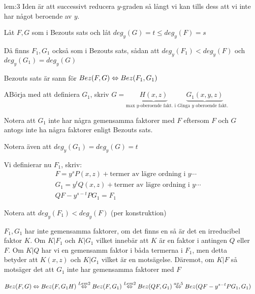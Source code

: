 \par\bigskip
\begin{lem}[3]{lem:3}
  Iden är att successivt reducera $y$-graden så långt vi kan tills dess att vi inte har något beroende av $y$.
  \par\bigskip
  \noindent Låt $F,G$ som i Bezouts sats och låt $deg_y(G) = t\leq deg_y(F) = s$ 
  \par\bigskip
  \noindent Då finns $F_1,G_1$ också som i Bezouts sats, sådan att $deg_y(F_1)<deg_y(F)$ och $deg_y(G_1) = deg_y(G)$\par
  \noindent Bezouts sats är sann för $Bez(F,G)\Leftrightarrow Bez(F_1,G_1)$
\end{lem}
\par\bigskip
\begin{prf}
  ABörja med att definiera $G_1$, skriv $G= \underbrace{H(x,z)}_{\text{max $y$-oberoende fakt. i $G$}}\underbrace{G_1(x,y,z)}_{\text{inga $y$ oberoende fakt.}}$
  \par\bigskip
  \noindent Notera att $G_1$ inte har några gemensamma faktorer med $F$ eftersom $F$ och $G$ antogs inte ha några faktorer enligt Bezouts sats. 
  \par\bigskip
  \noindent Notera även att $deg_y(G_1) = deg_y(G) = t$
  \par\bigskip
  \noindent Vi definierar nu $F_1$, skriv:
  \begin{equation*}
    \begin{gathered}
      F=y^sP(x,z)+\text{termer av lägre ordning i $y$}\cdots\\
      G_1 = y^tQ(x,z)+\text{termer av lägre ordning i $y$}\cdots\\
      QF-y^{s-t}PG_1 = F_1
    \end{gathered}
  \end{equation*}\par
  \noindent Notera att $deg_y(F_1)<deg_y(F)$ (per konstruktion)
  \par\bigskip
  \noindent $F_1,G_1$ har inte gemensamma faktorer, om det finns en så är det en irreducibel faktor $K$. Om $K|F_1$ och $K|G_1$ vilket innebär att $K$ är en faktor i antingen $Q$ eller $F$. Om $K|Q$ har vi en gemensamm faktor i båda termerna i $F_1$, men detta betyder att $K(x,z)$ och $K|G_1$ vilket är en motsägelse. Däremot, om $K|F$ så motsäger det att $G_1$ inte har gemensamma faktorer med $F$ 
  \par\bigskip
  \begin{equation*}
    \begin{gathered}
      Bez(F,G)\Leftrightarrow Bez(F,G_1H)\stackrel{Lem2}{\Leftrightarrow} Bez(F,G_1)\stackrel{Lem2}{\Leftrightarrow} Bez(QF,G_1)\stackrel{ax.5}{\Leftrightarrow} Bez(QF-y^{s-t}PG_1,G_1)\\
    \end{gathered}
  \end{equation*}
\end{prf}
